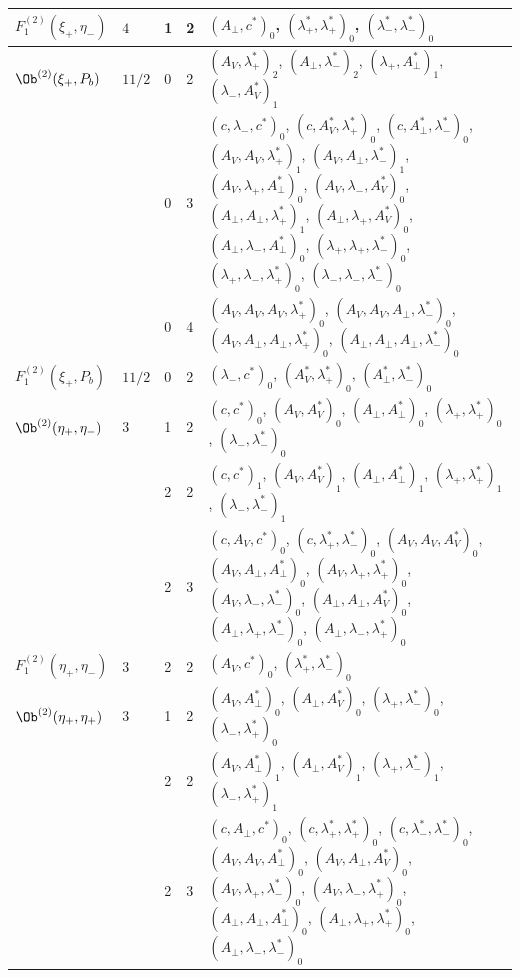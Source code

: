 {\begin{longtable}{>{\raggedright}p{2.3cm}|p{0.6cm}|p{0.25cm}|p{0.25cm}|>{\raggedright\arraybackslash}p{11.6cm}}
\hline
$F_1^{(2)}(\xi_+,\eta_-)$ & $4$ & 1 & 2 & $(A_\perp,c^*)_{0}$, $(\lambda^*_+,\lambda^*_+)_{0}$, $(\lambda^*_-,\lambda^*_-)_{0}$ \\
\hline
$\Ob^{(2)}(\xi_+,P_b)$ & $11/2$ & 0 & 2 & $(A_V,\lambda^*_+)_{2}$, $(A_\perp,\lambda^*_-)_{2}$, $(\lambda_+,A^*_\perp)_{1}$, $(\lambda_-,A^*_V)_{1}$ \\
 &  & 0 & 3 & $(c,\lambda_-,c^*)_{0}$, $(c,A^*_V,\lambda^*_+)_{0}$, $(c,A^*_\perp,\lambda^*_-)_{0}$, $(A_V,A_V,\lambda^*_+)_{1}$, $(A_V,A_\perp,\lambda^*_-)_{1}$, $(A_V,\lambda_+,A^*_\perp)_{0}$, $(A_V,\lambda_-,A^*_V)_{0}$, $(A_\perp,A_\perp,\lambda^*_+)_{1}$, $(A_\perp,\lambda_+,A^*_V)_{0}$, $(A_\perp,\lambda_-,A^*_\perp)_{0}$, $(\lambda_+,\lambda_+,\lambda^*_-)_{0}$, $(\lambda_+,\lambda_-,\lambda^*_+)_{0}$, $(\lambda_-,\lambda_-,\lambda^*_-)_{0}$ \\
 &  & 0 & 4 & $(A_V,A_V,A_V,\lambda^*_+)_{0}$, $(A_V,A_V,A_\perp,\lambda^*_-)_{0}$, $(A_V,A_\perp,A_\perp,\lambda^*_+)_{0}$, $(A_\perp,A_\perp,A_\perp,\lambda^*_-)_{0}$ \\
\hline
$F_1^{(2)}(\xi_+,P_b)$ & $11/2$ & 0 & 2 & $(\lambda_-,c^*)_{0}$, $(A^*_V,\lambda^*_+)_{0}$, $(A^*_\perp,\lambda^*_-)_{0}$ \\
\hline
$\Ob^{(2)}(\eta_+,\eta_-)$ & $3$ & 1 & 2 & $(c,c^*)_{0}$, $(A_V,A^*_V)_{0}$, $(A_\perp,A^*_\perp)_{0}$, $(\lambda_+,\lambda^*_+)_{0}$, $(\lambda_-,\lambda^*_-)_{0}$ \\
 &  & 2 & 2 & $(c,c^*)_{1}$, $(A_V,A^*_V)_{1}$, $(A_\perp,A^*_\perp)_{1}$, $(\lambda_+,\lambda^*_+)_{1}$, $(\lambda_-,\lambda^*_-)_{1}$ \\
 &  & 2 & 3 & $(c,A_V,c^*)_{0}$, $(c,\lambda^*_+,\lambda^*_-)_{0}$, $(A_V,A_V,A^*_V)_{0}$, $(A_V,A_\perp,A^*_\perp)_{0}$, $(A_V,\lambda_+,\lambda^*_+)_{0}$, $(A_V,\lambda_-,\lambda^*_-)_{0}$, $(A_\perp,A_\perp,A^*_V)_{0}$, $(A_\perp,\lambda_+,\lambda^*_-)_{0}$, $(A_\perp,\lambda_-,\lambda^*_+)_{0}$ \\
\hline
$F_1^{(2)}(\eta_+,\eta_-)$ & $3$ & 2 & 2 & $(A_V,c^*)_{0}$, $(\lambda^*_+,\lambda^*_-)_{0}$ \\
\hline
$\Ob^{(2)}(\eta_+,\eta_+)$ & $3$ & 1 & 2 & $(A_V,A^*_\perp)_{0}$, $(A_\perp,A^*_V)_{0}$, $(\lambda_+,\lambda^*_-)_{0}$, $(\lambda_-,\lambda^*_+)_{0}$ \\
 &  & 2 & 2 & $(A_V,A^*_\perp)_{1}$, $(A_\perp,A^*_V)_{1}$, $(\lambda_+,\lambda^*_-)_{1}$, $(\lambda_-,\lambda^*_+)_{1}$ \\
 &  & 2 & 3 & $(c,A_\perp,c^*)_{0}$, $(c,\lambda^*_+,\lambda^*_+)_{0}$, $(c,\lambda^*_-,\lambda^*_-)_{0}$, $(A_V,A_V,A^*_\perp)_{0}$, $(A_V,A_\perp,A^*_V)_{0}$, $(A_V,\lambda_+,\lambda^*_-)_{0}$, $(A_V,\lambda_-,\lambda^*_+)_{0}$, $(A_\perp,A_\perp,A^*_\perp)_{0}$, $(A_\perp,\lambda_+,\lambda^*_+)_{0}$, $(A_\perp,\lambda_-,\lambda^*_-)_{0}$ \\

\end{longtable}}
